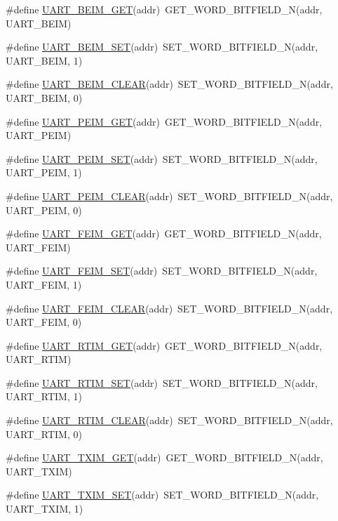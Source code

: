 \begin{DoxyCompactItemize}
\item 
\#define \hyperlink{a00574_a46c83d8c4594c65bfd0ac5aca260adc4}{UART\_\-BEIM\_\-GET}(addr)~GET\_\-WORD\_\-BITFIELD\_\-N(addr, UART\_\-BEIM)
\item 
\#define \hyperlink{a00574_a85239b1b893177e75e9dffbe69dc5dd7}{UART\_\-BEIM\_\-SET}(addr)~SET\_\-WORD\_\-BITFIELD\_\-N(addr, UART\_\-BEIM, 1)
\item 
\#define \hyperlink{a00574_ab8ba0f5e2fd9277176d15acf1942240e}{UART\_\-BEIM\_\-CLEAR}(addr)~SET\_\-WORD\_\-BITFIELD\_\-N(addr, UART\_\-BEIM, 0)
\item 
\#define \hyperlink{a00574_ac866082a48e69b48a49df42bbde2e533}{UART\_\-PEIM\_\-GET}(addr)~GET\_\-WORD\_\-BITFIELD\_\-N(addr, UART\_\-PEIM)
\item 
\#define \hyperlink{a00574_ab83659159c8cbf408bae27d06499ca39}{UART\_\-PEIM\_\-SET}(addr)~SET\_\-WORD\_\-BITFIELD\_\-N(addr, UART\_\-PEIM, 1)
\item 
\#define \hyperlink{a00574_ace582efae78172d5819ed6acdb163a17}{UART\_\-PEIM\_\-CLEAR}(addr)~SET\_\-WORD\_\-BITFIELD\_\-N(addr, UART\_\-PEIM, 0)
\item 
\#define \hyperlink{a00574_a41226a93a0b0227501bcfe6cd4325405}{UART\_\-FEIM\_\-GET}(addr)~GET\_\-WORD\_\-BITFIELD\_\-N(addr, UART\_\-FEIM)
\item 
\#define \hyperlink{a00574_a97ed1f3d9ca7cf909dc5fb42ae9090b5}{UART\_\-FEIM\_\-SET}(addr)~SET\_\-WORD\_\-BITFIELD\_\-N(addr, UART\_\-FEIM, 1)
\item 
\#define \hyperlink{a00574_ac5beee28297b025672a5c5d155721a38}{UART\_\-FEIM\_\-CLEAR}(addr)~SET\_\-WORD\_\-BITFIELD\_\-N(addr, UART\_\-FEIM, 0)
\item 
\#define \hyperlink{a00574_ab40db3e6439105826dc0783131e126d2}{UART\_\-RTIM\_\-GET}(addr)~GET\_\-WORD\_\-BITFIELD\_\-N(addr, UART\_\-RTIM)
\item 
\#define \hyperlink{a00574_a2ed6310e5bd686ba726fd16e68a9df7e}{UART\_\-RTIM\_\-SET}(addr)~SET\_\-WORD\_\-BITFIELD\_\-N(addr, UART\_\-RTIM, 1)
\item 
\#define \hyperlink{a00574_a84e3b437bdc9d5ff25c8857d0224c2e0}{UART\_\-RTIM\_\-CLEAR}(addr)~SET\_\-WORD\_\-BITFIELD\_\-N(addr, UART\_\-RTIM, 0)
\item 
\#define \hyperlink{a00574_abeb9a0d139eb9fefe0b4cff9b62d7c16}{UART\_\-TXIM\_\-GET}(addr)~GET\_\-WORD\_\-BITFIELD\_\-N(addr, UART\_\-TXIM)
\item 
\#define \hyperlink{a00574_a1c948a1c01205a867db8652ecc121154}{UART\_\-TXIM\_\-SET}(addr)~SET\_\-WORD\_\-BITFIELD\_\-N(addr, UART\_\-TXIM, 1)

\end{DoxyCompactItemize}
